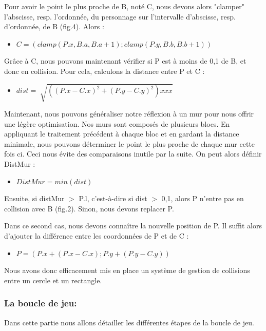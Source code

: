 \documentclass[11pt]{article}
\begin{document}
Pour avoir le point le plus proche de B, noté C, nous devons alors "clamper" 
l'abscisse, resp. l'ordonnée, du personnage sur l'intervalle d'abscisse, 
resp. d'ordonnée, de B (fig.4). Alors :

\begin{itemize}
	\item[] $C = (clamp(P.x, B.a, B.a +1) ; clamp(P.y, B.b, B.b +1))$
\end{itemize}

Grâce à C, nous pouvons maintenant vérifier si P est à moins de 0,1 de B, 
et donc en collision. Pour cela, calculons la distance entre P et C :
\begin{itemize}
	\item[] $dist = \sqrt[]{((P.x - C.x)^2 + (P.y - C.y)^2) xx  x}$
\end{itemize}

Maintenant, nous pouvons généraliser notre réflexion à un mur pour nous 
offrir une légère optimisation. Nos murs sont composés de plusieurs blocs. 
En appliquant le traitement précédent à chaque bloc et en gardant la 
distance minimale, nous pouvons déterminer le point le plus proche de 
chaque mur cette fois ci. Ceci nous évite des comparaisons inutile par la 
suite. On peut alors définir DistMur :

\begin{itemize}
	\item[] $DistMur = min(dist)$
\end{itemize}


Ensuite, si distMur $>$ P.l, c'est-à-dire si dist $>$ 0,1, alors P n'entre pas 
en collision avec B (fig.2). Sinon, nous devons replacer P.

Dans ce second cas, nous devons connaître la nouvelle position de P. Il 
suffit alors d'ajouter la différence entre les coordonnées de P et de C :

\begin{itemize}
	\item[] $P = (P.x + (P.x - C.x) ; P.y + (P.y - C.y))$
\end{itemize}

Nous avons donc efficacement mis en place un système de gestion de 
collisions entre un cercle et un rectangle.


\subsubsection{La boucle de jeu:}
Dans cette partie nous allons détailler les différentes étapes de la boucle de jeu.
\end{document}
